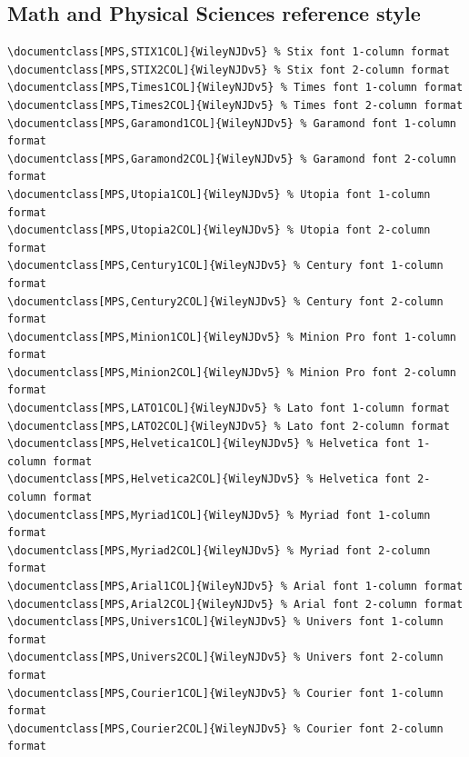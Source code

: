 \documentclass[11pt]{article}
\begin{document}
\subsection*{Math and Physical Sciences reference style}
{\fontsize{9}{10}\selectfont\begin{verbatim}
\documentclass[MPS,STIX1COL]{WileyNJDv5} % Stix font 1-column format
\documentclass[MPS,STIX2COL]{WileyNJDv5} % Stix font 2-column format
\documentclass[MPS,Times1COL]{WileyNJDv5} % Times font 1-column format
\documentclass[MPS,Times2COL]{WileyNJDv5} % Times font 2-column format
\documentclass[MPS,Garamond1COL]{WileyNJDv5} % Garamond font 1-column format
\documentclass[MPS,Garamond2COL]{WileyNJDv5} % Garamond font 2-column format
\documentclass[MPS,Utopia1COL]{WileyNJDv5} % Utopia font 1-column format
\documentclass[MPS,Utopia2COL]{WileyNJDv5} % Utopia font 2-column format
\documentclass[MPS,Century1COL]{WileyNJDv5} % Century font 1-column format
\documentclass[MPS,Century2COL]{WileyNJDv5} % Century font 2-column format
\documentclass[MPS,Minion1COL]{WileyNJDv5} % Minion Pro font 1-column format
\documentclass[MPS,Minion2COL]{WileyNJDv5} % Minion Pro font 2-column format
\documentclass[MPS,LATO1COL]{WileyNJDv5} % Lato font 1-column format
\documentclass[MPS,LATO2COL]{WileyNJDv5} % Lato font 2-column format
\documentclass[MPS,Helvetica1COL]{WileyNJDv5} % Helvetica font 1-column format
\documentclass[MPS,Helvetica2COL]{WileyNJDv5} % Helvetica font 2-column format
\documentclass[MPS,Myriad1COL]{WileyNJDv5} % Myriad font 1-column format
\documentclass[MPS,Myriad2COL]{WileyNJDv5} % Myriad font 2-column format
\documentclass[MPS,Arial1COL]{WileyNJDv5} % Arial font 1-column format
\documentclass[MPS,Arial2COL]{WileyNJDv5} % Arial font 2-column format
\documentclass[MPS,Univers1COL]{WileyNJDv5} % Univers font 1-column format
\documentclass[MPS,Univers2COL]{WileyNJDv5} % Univers font 2-column format
\documentclass[MPS,Courier1COL]{WileyNJDv5} % Courier font 1-column format
\documentclass[MPS,Courier2COL]{WileyNJDv5} % Courier font 2-column format
\end{verbatim}}
\end{document}
